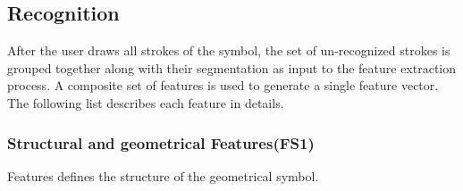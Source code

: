 \documentclass[preprint,10pt,5p,twocolumn]{elsarticle}
\begin{document}
\subsection{Recognition}
\label{sec:Recognition}
After the user draws all strokes of the symbol, the set of un-recognized strokes is grouped together along with their segmentation as input to the feature extraction process. A composite set of features is used to generate a single feature vector. The following list describes each feature in details.
\subsubsection{Structural and geometrical Features(FS1)}
  Features defines the structure of the geometrical symbol.  
%
\end{document}
